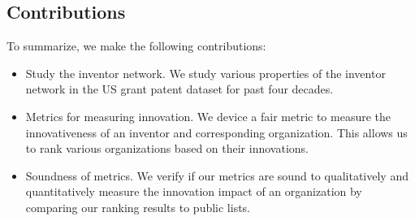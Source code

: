 \subsection{Contributions}

To summarize, we make the following contributions:

\begin{itemize} 
\squish
\item {Study the inventor network.} We study various properties of the inventor network in the US grant patent dataset for past four decades.  
\item {Metrics for measuring innovation.} We device a fair metric to measure the innovativeness of an inventor and corresponding organization. This allows us to rank various organizations based on their innovations. 
\item {Soundness of metrics.} We verify if our metrics are sound to qualitatively and quantitatively measure the innovation impact of an organization by comparing our ranking results to public lists.
\end{itemize}


